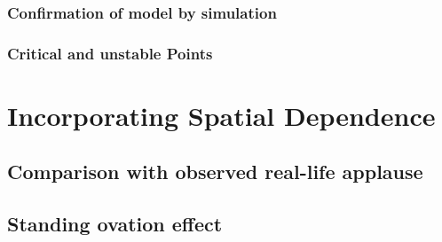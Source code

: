 \documentclass{article}
\begin{document}
  \subsubsection{Confirmation of model by simulation}
  \subsubsection{Critical and unstable Points}
  
\section{Incorporating Spatial Dependence}
 \subsection{Comparison with observed real-life applause}
 \subsection{Standing ovation effect}
 
\end{document}

